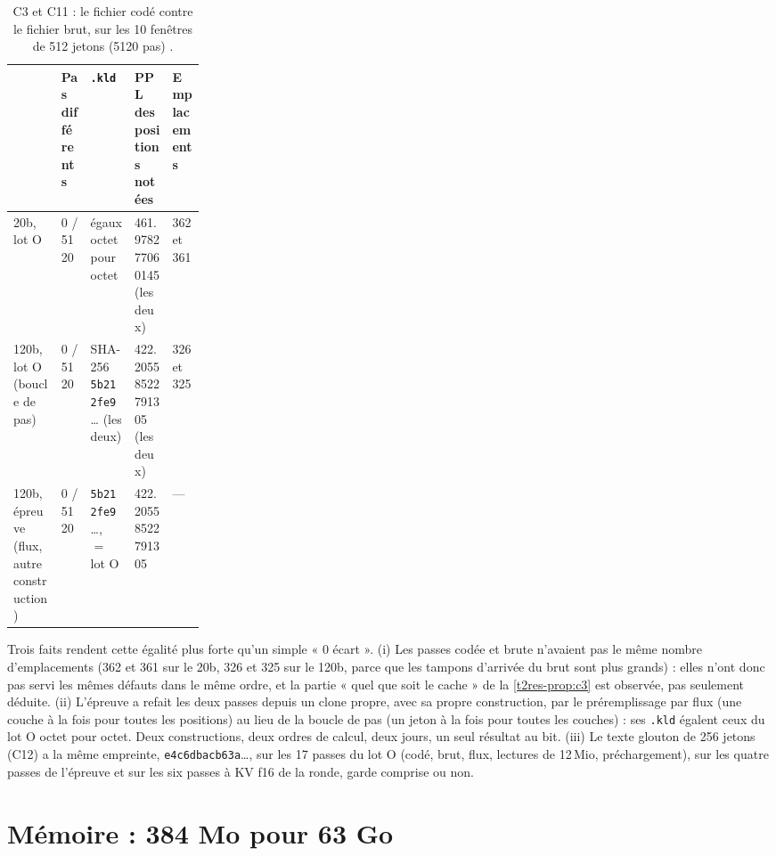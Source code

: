 \begin{table}[ht]
\centering\footnotesize
\caption[C3 et C11 : codé contre brut]{C3 et C11 : le fichier codé contre le fichier brut, sur les 10 fenêtres de 512 jetons (\num{5120} pas) \mes.}
\label{t2res-tab:c3}
\begin{tabularx}{\linewidth}{@{}>{\raggedright\arraybackslash}p{0.25\linewidth}l>{\raggedright\arraybackslash}Xll@{}}
\toprule
& Pas différents & \texttt{.kld} & PPL des positions notées & Emplacements \\
\midrule
20b, lot O & 0 / \num{5120} & égaux octet pour octet & \num{461.978277060145} (les deux) & 362 et 361 \\
120b, lot O (boucle de pas) & 0 / \num{5120} & SHA-256 \texttt{5b212fe9}… (les deux) & \num{422.20558522791305} (les deux) & 326 et 325 \\
120b, épreuve (flux, autre construction) & 0 / \num{5120} & \texttt{5b212fe9}…, $=$ lot O & \num{422.20558522791305} & --- \\
\bottomrule
\end{tabularx}
\end{table}

Trois faits rendent cette égalité plus forte qu'un simple « 0 écart ». (i) Les passes codée et brute n'avaient pas le même nombre d'emplacements (362 et 361 sur le 20b, 326 et 325 sur le 120b, parce que les tampons d'arrivée du brut sont plus grands) : elles n'ont donc pas servi les mêmes défauts dans le même ordre, et la partie « quel que soit le cache » de la \cref{t2res-prop:c3} est observée, pas seulement déduite. (ii) L'épreuve a refait les deux passes depuis un clone propre, avec sa propre construction, par le préremplissage par flux (une couche à la fois pour toutes les positions) au lieu de la boucle de pas (un jeton à la fois pour toutes les couches) : ses \texttt{.kld} égalent ceux du lot O octet pour octet. Deux constructions, deux ordres de calcul, deux jours, un seul résultat au bit. (iii) Le texte glouton de 256 jetons (C12) a la même empreinte, \texttt{e4c6dbacb63a}…, sur les 17 passes du lot O (codé, brut, flux, lectures de 12\,Mio, préchargement), sur les quatre passes de l'épreuve et sur les six passes à KV f16 de la ronde, garde comprise ou non.

\section{Mémoire : 384 Mo pour 63 Go}\label{t2res-sec:memoire}

